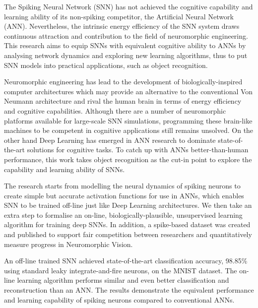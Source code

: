 The Spiking Neural Network (SNN) has not achieved the cognitive capability and learning ability of its non-spiking competitor, the Artificial Neural Network (ANN).
Nevertheless, the intrinsic energy efficiency of the SNN system draws continuous attraction and contribution to the field of neuromorphic engineering.
This research aims to equip SNNs with equivalent cognitive ability to ANNs by analysing network dynamics and exploring new learning algorithms, thus to put SNN models into practical applications, such as object recognition.

Neuromorphic engineering has lead to the development of biologically-inspired computer architectures which may provide an alternative to the conventional Von Neumann architecture and rival the human brain in terms of energy efficiency and cognitive capabilities.
Although there are a number of neuromorphic platforms available for large-scale SNN simulations, programming these brain-like machines to be competent in cognitive applications still remains unsolved.
On the other hand Deep Learning has emerged in ANN research to dominate state-of-the-art solutions for cognitive tasks.
To catch up with ANNs better-than-human performance, this work takes object recognition as the cut-in point to explore the capability and learning ability of SNNs.

The research starts from modelling the neural dynamics of spiking neurons to create simple but accurate activation functions for use in ANNs, which enables SNN to be trained off-line just like Deep Learning architectures.
We then take an extra step to formalise an on-line, biologically-plausible, unsupervised learning algorithm for training deep SNNs.
In addition, a spike-based dataset was created and published to support fair competition between researchers and quantitatively measure progress in Neuromorphic Vision.

An off-line trained SNN achieved state-of-the-art classification accuracy, 98.85\% using standard leaky integrate-and-fire neurons, on the MNIST dataset. 
The on-line learning algorithm performs similar and even better classification and reconstruction than an ANN. 
The results demonstrate the equivalent performance and learning capability of spiking neurons compared to conventional ANNs.
